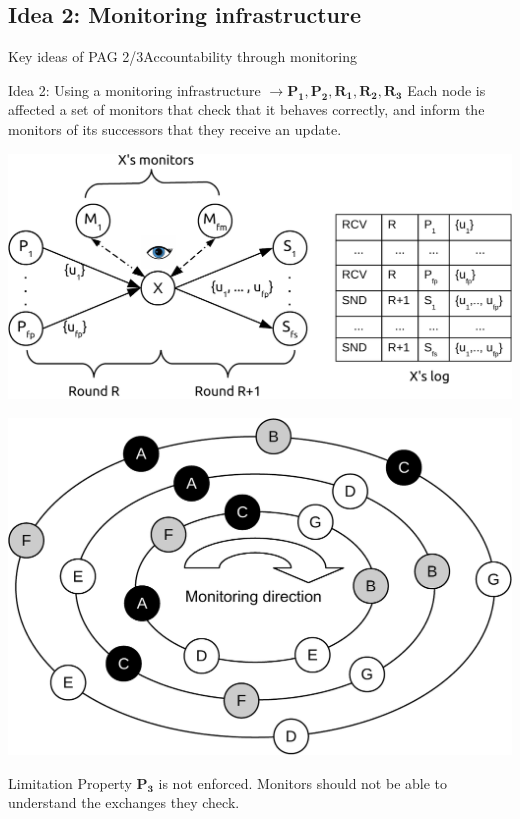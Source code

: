 \documentclass[10pt]{beamer}
\begin{document}
\subsection{Idea 2: Monitoring infrastructure}
\begin{frame}{Key ideas of PAG 2/3}{Accountability through monitoring}
\minipage[c][0.7\textheight][s]{\textwidth} 
  \begin{block}{Idea 2: Using a monitoring infrastructure $\longrightarrow \mathbf{P_1}, \mathbf{P_2}, \mathbf{R_1}, \mathbf{R_2}, \mathbf{R_3} $}
  Each node is affected a set of monitors that check that it behaves correctly, and inform the monitors of its successors that they receive an update. 
  \end{block}
  \vfill
   {
  \begin{center}
     \includegraphics[height=.4\textheight]{fig/PAG/AccountableGossip}
  \end{center}
  }
  
   {
  \begin{center}
     \includegraphics[height=.4\textheight]{fig/PAG/firefliesMembership}
  \end{center}
  }
  
   {
    \begin{block}{Limitation}
  Property $\mathbf{P_3}$ is not enforced. Monitors should not be able to understand the exchanges they check. 
  \end{block}
  }
\endminipage
\end{frame}
\end{document}

